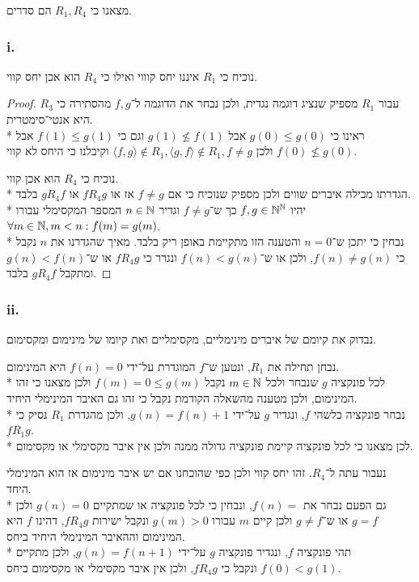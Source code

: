 \Subquestion{}
מצאנו כי $R_1, R_4$ הם סדרים.

\subsubsection{i.}
נוכיח כי $R_1$ איננו יחס קוווי ואילו כי $R_4$ הוא אכן יחס קווי.
\begin{proof}
	עבור $R_1$ מספיק שנציג דוגמה נגדית, ולכן נבחר את הדוגמה ל־$f, g$ מהסתירה כי $R_3$ היא אנטי־סימטרית. \\*
	ראינו כי $g(0) \le g(0)$ אבל $g(1) \not\le f(1)$ וגם כי $f(1) \le g(1)$ אבל $f(0) \not\le g(0)$ ולכן $\langle f, g \rangle \notin R_1, \langle g, f \rangle \notin R_1, f \ne g$ וקיבלנו כי היחס לא קווי.

	נוכיח כי $R_4$ הוא אכן קווי. \\*
	הגדרתו מכילה איברים שווים ולכן מספיק שנוכיח כי אם $f \ne g$ אז או $f R_4 g$ או $g R_4 f$ בלבד. \\*
	יהיו $f, g \in \mathbb{N}^{\mathbb{N}}$ כך ש־$f \ne g$ וגדיר $n \in \mathbb{N}$ המספר המקסימלי עבורו $\forall m \in \mathbb{N}, m < n : f(m) = g(m)$. \\*
	נבחין כי יתכן ש־$n = 0$ והטענה הזו מתקיימת באופן ריק בלבד. 
	מאיך שהגדרנו את $n$ נקבל כי $f(n) \ne g(n)$, ולכן או ש־$f(n) < g(n)$ ונגרר כי $f R_4 g$ או ש־$g(n) < f(n)$ ומתקבל $g R_4 f$ בלבד.
\end{proof}

\subsubsection{ii.}
נבדוק את קיומם של איברים מינימליים, מקסימליים ואת קיומו של מינימום ומקסימום.

נבחן תחילה את $R_1$, ונטען ש־$f$ המוגדרת על־ידי $f(n) = 0$ היא המינימום. \\*
לכל פונקציה $g$ שנבחר ולכל $m \in \mathbb{N}$ נקבל $f(m) = 0 \le g(m)$ ולכן מצאנו כי זהו המינימום, ולכן מטענה מהשאלה הקודמת נקבל כי זהו גם האיבר המינימלי היחיד. \\*
נבחר פונקציה כלשהי $f$, ונגדיר $g$ על־ידי $g(n) = f(n) + 1$, ולכן מהגדרת $R_1$ נסיק כי $f R_1 g$. \\*
לכן מצאנו כי לכל פונקציה קיימת פונקציה גדולה ממנה ולכן אין איבר מקסימלי או מקסימום.

נעבור עתה ל־$R_4$. זהו יחס קווי ולכן כפי שהוכחנו אם יש איבר מינימום אז הוא המינימלי היחד. \\*
גם הפעם נבחר את $f(n) = $, ונבחין כי לכל פונקציה או שמתקיים $g(n) = 0$ ולכן $g = f$ או ש־$g \ne f$ ולכן קיים $m$ עבורו $g(m) > 0$ ונקבל ישירות $f R_4 g$, דהינו $f$ היא המינימום וההאיבר המינימלי היחיד ביחס. \\*
תהי פונקציה $f$, ונגדיר פונקציה $g$ על־ידי $g(n) = f(n + 1)$, ולכן מתקיים $f(0) < g(1)$ ונקבל כי $f R_4 g$, ולכן אין איבר מקסימלי או מקסימום ביחס.

